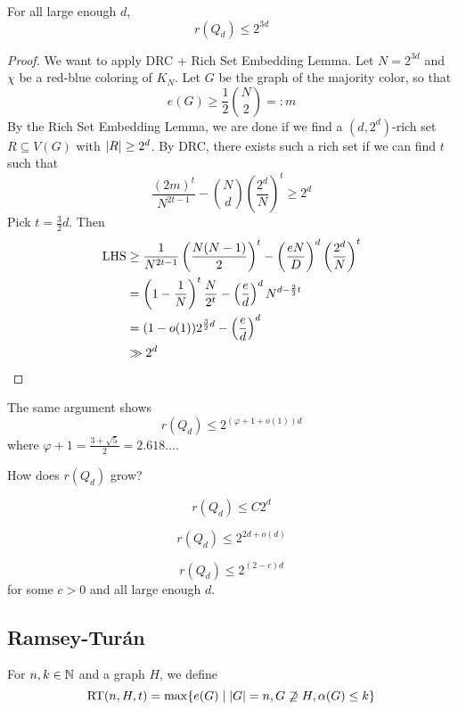 \documentclass{article}
\begin{document}
\begin{thm}
  For all large enough $d$,
  $$r(Q_d) \le 2^{3d}$$
\end{thm}
\begin{proof}
  We want to apply DRC + Rich Set Embedding Lemma. Let $N = 2^{3d}$ and $\chi$ be a red-blue coloring of $K_N$. Let $G$ be the graph of the majority color, so that
  $$e(G) \ge \frac 12 \binom N2 =: m$$
  By the Rich Set Embedding Lemma, we are done if we find a $(d, 2^d)$-rich set $R \subseteq V(G)$ with $\left\lvert R\right\rvert \ge 2^d$. By DRC, there exists such a rich set if we can find $t$ such that
  $$\frac{(2m)^t}{N^{2t - 1}} - \binom Nd \left(\frac{2^d}N\right)^t \ge 2^d$$
  Pick $t = \frac 32 d$. Then
  \begin{align*}
    \operatorname{LHS}
    & \ge \frac 1{N^{2t - 1}} \left(\frac{N(N - 1)}2\right)^t - \left(\frac{eN}D\right)^d \left(\frac{2^d}N\right)^t \\
    & = \left(1 - \frac 1N\right)^t \frac N{2^t} - \left(\frac ed\right)^d N^{d - \frac 23 t} \\
    & = (1 - o(1))2^{\frac 32 d} - \left(\frac ed\right)^d \\
    & \gg 2^d
  \end{align*}
\end{proof}
\begin{rmk}
  The same argument shows
  $$r(Q_d) \le 2^{(\varphi + 1 + o(1))d}$$
  where $\varphi + 1 = \frac{3 + \sqrt 5}2 = 2.618\dots$.
\end{rmk}

How does $r(Q_d)$ grow?

\begin{conj}[Erd\H os]
  $$r(Q_d) \le C 2^d$$
\end{conj}

\begin{thm}
  $$r(Q_d) \le 2^{2d + o(d)}$$
\end{thm}

\begin{thm}[Tikharimov]
  $$r(Q_d) \le 2^{(2 - c)d}$$
  for some $c > 0$ and all large enough $d$.
\end{thm}


\subsection{Ramsey-Tur\' an}

\begin{dfn}
  For $n, k \in \mathbb N$ and a graph $H$, we define
  $$\mathrm{RT}(n, H, t) = \max\{e(G) \mid \left\lvert G\right\rvert = n, G \not\supseteq H, \alpha(G) \le k\}$$
\end{dfn}
\end{document}
